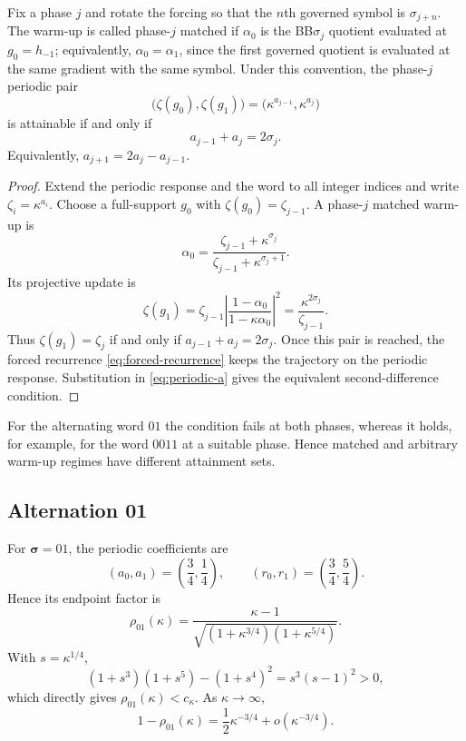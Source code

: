\documentclass[letterpaper,twoside]{article}
\begin{document}
\begin{lemma}\label{lem:matched-reachability}
Fix a phase $j$ and rotate the forcing so that the $n$th governed symbol is
$\sigma_{j+n}$.  The warm-up is called phase-$j$ matched if $\alpha_0$ is
the BB$\sigma_j$ quotient evaluated at $g_0=h_{-1}$; equivalently,
$\alpha_0=\alpha_1$, since the first governed quotient is evaluated at the
same gradient with the same symbol.  Under this convention, the phase-$j$
periodic pair
\[
 \bigl(\zeta(g_0),\zeta(g_1)\bigr)
 =\bigl(\kappa^{a_{j-1}},\kappa^{a_j}\bigr)
\]
is attainable if and only if
\[
 a_{j-1}+a_j=2\sigma_j.
\]
Equivalently, $a_{j+1}=2a_j-a_{j-1}$.
\end{lemma}

\begin{proof}
Extend the periodic response and the word to all integer indices and write
$\zeta_i=\kappa^{a_i}$.  Choose a full-support $g_0$ with
$\zeta(g_0)=\zeta_{j-1}$.  A phase-$j$ matched warm-up is
\[
 \alpha_0=
 \frac{\zeta_{j-1}+\kappa^{\sigma_j}}
      {\zeta_{j-1}+\kappa^{\sigma_j+1}}.
\]
Its projective update is
\[
 \zeta(g_1)
 =\zeta_{j-1}
  \left|\frac{1-\alpha_0}{1-\kappa\alpha_0}\right|^2
 =\frac{\kappa^{2\sigma_j}}{\zeta_{j-1}}.
\]
Thus $\zeta(g_1)=\zeta_j$ if and only if
$a_{j-1}+a_j=2\sigma_j$.  Once this pair is reached, the forced recurrence
\eqref{eq:forced-recurrence} keeps the trajectory on the periodic response.
Substitution in \eqref{eq:periodic-a} gives the equivalent
second-difference condition.
\end{proof}

For the alternating word $01$ the condition fails at both phases, whereas it
holds, for example, for the word $0011$ at a suitable phase.  Hence matched
and arbitrary warm-up regimes have different attainment sets.

\subsection{Alternation 01}

For $\bm\sigma=01$, the periodic coefficients are
\[
 (a_0,a_1)=\left(\frac34,\frac14\right),
 \qquad
 (r_0,r_1)=\left(\frac34,\frac54\right).
\]
Hence its endpoint factor is
\begin{equation}\label{eq:rho01}
 \rho_{01}(\kappa)
 =\frac{\kappa-1}
 {\sqrt{(1+\kappa^{3/4})(1+\kappa^{5/4})}}.
\end{equation}
With $s=\kappa^{1/4}$,
\[
 (1+s^3)(1+s^5)-(1+s^4)^2=s^3(s-1)^2>0,
\]
which directly gives $\rho_{01}(\kappa)<c_\kappa$.  As $\kappa\to\infty$,
\begin{equation}\label{eq:rho01-asymptotic}
 1-\rho_{01}(\kappa)
 =\frac12\kappa^{-3/4}+o(\kappa^{-3/4}).
\end{equation}
\end{document}
